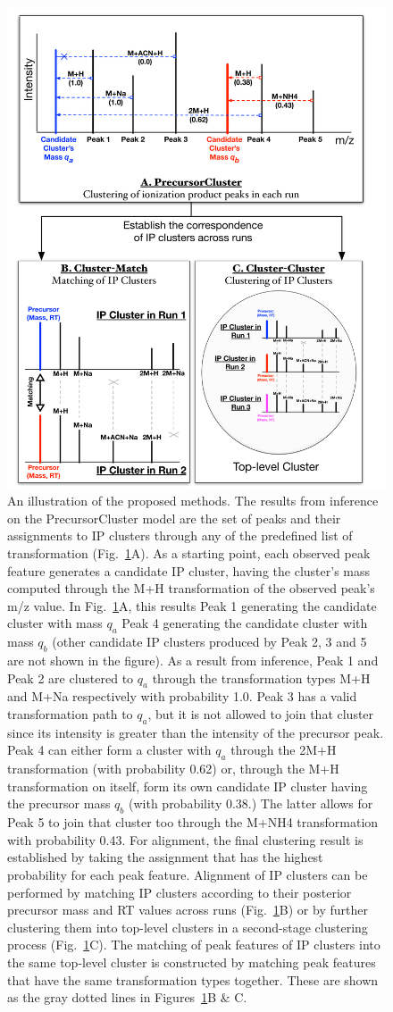 \begin{figure}[!htbp]
\centering
\includegraphics[width=0.75\linewidth]{05-precursor-cluster/figures/fig1.pdf}
\caption{\label{fig:01} An illustration of the proposed methods. The results from inference on the PrecursorCluster model are the set of peaks and their assignments to IP clusters through any of the predefined list of transformation (Fig.~\ref{fig:01}A). As a starting point, each observed peak feature generates a candidate IP cluster, having the cluster's mass computed through the M+H transformation of the observed peak's m/z value. In Fig.~\ref{fig:01}A, this results Peak 1 generating the candidate cluster with mass $q_a$ Peak 4 generating the candidate cluster with mass $q_b$ (other candidate IP clusters produced by Peak 2, 3 and 5 are not shown in the figure). As a result from inference, Peak 1 and Peak 2 are clustered to $q_a$ through the transformation types M+H and M+Na respectively with probability 1.0. Peak 3 has a valid transformation path to $q_a$, but it is not allowed to join that cluster since its intensity is greater than the intensity of the precursor peak. Peak 4 can either form a cluster with $q_a$ through the 2M+H transformation (with probability 0.62) or, through the M+H transformation on itself, form its own candidate IP cluster having the precursor mass $q_b$ (with probability 0.38.) The latter allows for Peak 5 to join that cluster too through the M+NH4 transformation with probability 0.43. For alignment, the final clustering result is established by taking the assignment that has the highest probability for each peak feature. Alignment of IP clusters can be performed by matching IP clusters according to their posterior precursor mass and RT values across runs (Fig.~\ref{fig:01}B) or by further clustering them into top-level clusters in a second-stage clustering process (Fig.~\ref{fig:01}C). The matching of peak features of IP clusters into the same top-level cluster is constructed by matching peak features that have the same transformation types together. These are shown as the gray dotted lines in Figures~\ref{fig:01}B \& C.}
\end{figure}

